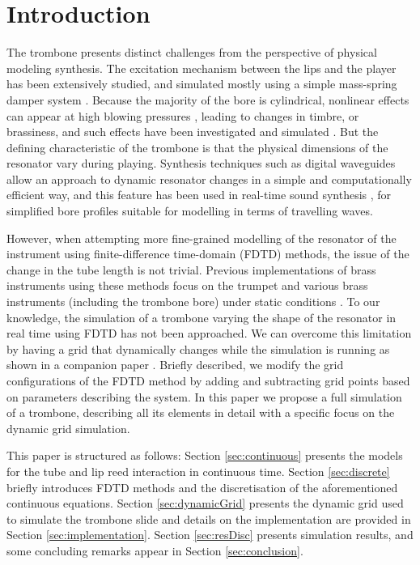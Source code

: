 \section{Introduction}\label{sec:introduction}

The trombone presents distinct challenges from the perspective of physical modeling synthesis.
The excitation mechanism between the lips and the player has been extensively studied, and simulated mostly using a simple mass-spring damper system \cite{campbell2004brass}.
Because the majority of the bore is cylindrical, nonlinear effects can appear at high blowing pressures \cite{Hirschberg96}, leading to changes in timbre, or brassiness, and such effects have been investigated and simulated
\cite{campbell2004brass, msallam1997physical,msallam2000physical}.
But the defining characteristic of the trombone is that the physical dimensions of the resonator vary during playing.
Synthesis techniques such as digital waveguides allow an approach to dynamic resonator changes in a simple and computationally efficient way, and this feature has been used in real-time sound synthesis \cite{cook2002real}, for simplified bore profiles suitable for modelling in terms of travelling waves.

However, when attempting more fine-grained modelling of the resonator of the instrument using finite-difference time-domain (FDTD) methods, the issue of the change in the tube length is not trivial. Previous implementations of brass instruments using these methods focus on the trumpet \cite{harrison2015environment} and various brass instruments (including the trombone bore) under static conditions \cite{Bilbao2013}. To our knowledge, the simulation of a trombone varying the shape of the resonator in real time using FDTD has not been approached.
We can overcome this limitation  by having a grid that 
 dynamically changes while the simulation is running as shown in a companion paper \cite{Willemsen2021}. Briefly described, we modify the grid configurations of the FDTD method by adding and subtracting grid points based on parameters describing the system. In this paper we propose a full simulation of a trombone, describing all its elements in detail with a specific focus on the dynamic grid simulation.

This paper is structured as follows: Section \ref{sec:continuous} presents the models for the tube and lip reed interaction in continuous time. Section \ref{sec:discrete} briefly introduces FDTD methods and the discretisation of the aforementioned continuous equations. Section \ref{sec:dynamicGrid} presents the dynamic grid used to simulate the trombone slide and details on the implementation are provided in Section \ref{sec:implementation}. Section \ref{sec:resDisc} presents simulation results, and some concluding remarks appear in Section \ref{sec:conclusion}.
